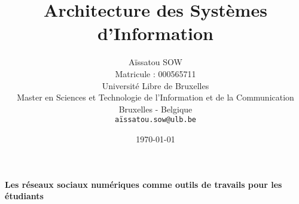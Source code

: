 \documentclass[12pt,a4paper,titlepage]{article}
\title{Architecture des Systèmes d'Information {}}
\author{Aïssatou SOW\\
   Matricule : 000565711\\
   Université Libre de Bruxelles\\
   Master en Sciences et Technologie de l'Information et de la Communication\\
   Bruxelles - Belgique\\
   \texttt{aïssatou.sow@ulb.be}}
\date{\today}
\begin{document}
\maketitle

\clearpage
\vspace*{\fill}
\begin{center}
\begin{minipage}{.6\textwidth}
\begin{center}
\huge {\textbf {Les réseaux sociaux numériques comme outils de travails pour les
étudiants  }} 
\end{center}
\end{minipage}
\end{center}
\vfill %
\clearpage

\tableofcontents


\newpage
\end{document}
